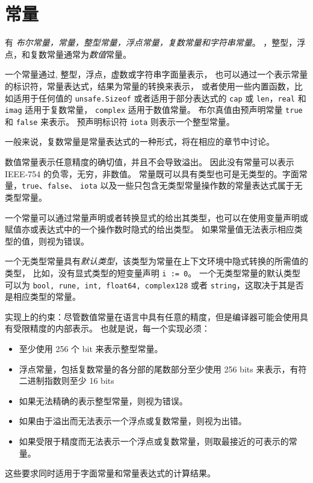 
\chapter{常量}
有 \emph{布尔常量，\rune{}常量，整型常量，浮点常量，复数常量和字符串常量}。
\rune{}，整型，浮点，和复数常量通常为\emph{数值}常量。

一个常量通过\rune{}, 整型，浮点，虚数或字符串字面量表示，
也可以通过一个表示常量的标识符，常量表达式，结果为常量的转换来表示，
或者使用一些内置函数，比如适用于任何值的 \lstinline|unsafe.Sizeof| 或者适用于部分表达式的 \lstinline|cap| 或 \lstinline|len|，\lstinline|real| 和 \lstinline|imag| 适用于复数常量，
\lstinline|complex| 适用于数值常量。
布尔真值由预声明常量 \lstinline|true| 和 \lstinline|false| 来表示。
预声明标识符 \lstinline|iota| 则表示一个整型常量。

一般来说，复数常量是常量表达式的一种形式，将在相应的章节中讨论。

数值常量表示任意精度的确切值，并且不会导致溢出。
因此没有常量可以表示 IEEE-754 的负零，无穷，非数值。
常量既可以具有类型也可是无类型的。字面常量，\lstinline|true|、\lstinline|false|、 \lstinline|iota| 以及一些只包含无类型常量操作数的常量表达式属于无类型常量。

一个常量可以通过常量声明或者转换显式的给出其类型，也可以在使用变量声明或赋值亦或表达式中的一个操作数时隐式的给出类型。
如果常量值无法表示相应类型的值，则视为错误。

一个无类型常量具有\emph{默认类型}，该类型为常量在上下文环境中隐式转换的所需值的类型，
比如，没有显式类型的短变量声明 \lstinline|i := 0|。
一个无类型常量的默认类型可以为 \lstinline|bool, rune, int, float64, complex128| 或者 \lstinline|string|，这取决于其是否是相应类型的常量。

实现上的约束：尽管数值常量在语言中具有任意的精度，但是编译器可能会使用具有受限精度的内部表示。
也就是说，每一个实现必须：
\begin{itemize}
\item 至少使用 256 个 bit 来表示整型常量。
\item 浮点常量，包括复数常量的各分部的尾数部分至少使用 256 bits 来表示，有符二进制指数则至少 16 bits
\item 如果无法精确的表示整型常量，则视为错误。
\item 如果由于溢出而无法表示一个浮点或复数常量，则视为出错。
\item 如果受限于精度而无法表示一个浮点或复数常量，则取最接近的可表示的常量。
\end{itemize}
这些要求同时适用于字面常量和常量表达式的计算结果。